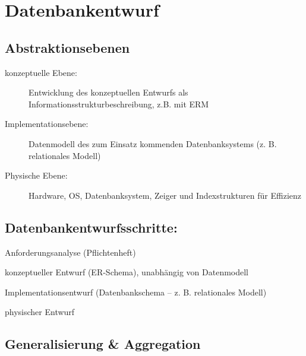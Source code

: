 \chapter{Datenbankentwurf}

\section{Abstraktionsebenen}

\begin{description}
\item[konzeptuelle Ebene:] Entwicklung des konzeptuellen Entwurfs als Informationsstrukturbeschreibung, z.B. mit ERM
\item[Implementationsebene:] Datenmodell des zum Einsatz kommenden Datenbanksystems (z. B. relationales Modell)
\item[Physische Ebene:] Hardware, OS, Datenbanksystem, Zeiger und Indexstrukturen für Effizienz
\end{description}

\section{Datenbankentwurfsschritte:}
\begin{arrowlist}
\item Anforderungsanalyse (Pflichtenheft) 
\item konzeptueller Entwurf (ER-Schema), unabhängig von Datenmodell 
\item Implementationsentwurf (Datenbankschema – z. B. relationales Modell) 
\item physischer Entwurf
\end{arrowlist}

\section{Generalisierung \& Aggregation}

